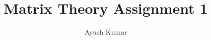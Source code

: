 \documentclass[journal,12pt,twocolumn]{IEEEtran}
\begin{document}
\makeatletter
{}
\makeatother
\let\StandardTheFigure\thefigure
\let\vec\mathbf
\renewcommand{\thefigure}{\theproblem}
\def\putbox#1#2#3{\makebox[0in][l]{\makebox[#1][l]{}\raisebox{\baselineskip}[0in][0in]{\raisebox{#2}[0in][0in]{#3}}}}
     \def\rightbox#1{\makebox[0in][r]{#1}}
     \def\centbox#1{\makebox[0in]{#1}}
     \def\topbox#1{\raisebox{-\baselineskip}[0in][0in]{#1}}
     \def\midbox#1{\raisebox{-0.5\baselineskip}[0in][0in]{#1}}
\vspace{3cm}
\title{Matrix Theory Assignment 1}
\author{Ayush Kumar}
%
%
%
% 
%
\end{document}
